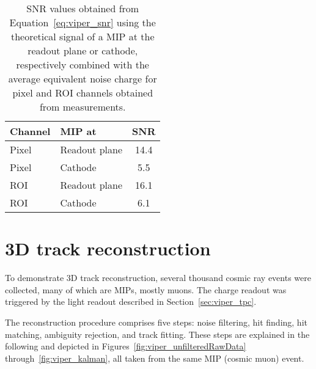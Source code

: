 \begin{table}[htb]
	\centering
	\caption{SNR values obtained from Equation~\eqref{eq:viper_snr} using the theoretical signal of a MIP at the readout plane or cathode, respectively combined with the average equivalent noise charge for pixel and ROI channels obtained from measurements.}
	\label{tab:viper_snr}
	\begin{tabu} to \textwidth {|l|l|S|}
		\hline
		{Channel} &	{MIP at} &			{SNR} \\
		\hline
		\hline
		{Pixel} &	{Readout plane} &	\num{14.4} \\
		\hline
		{Pixel} &	{Cathode} &			\num{5.5} \\
		\hline
		{ROI} &		{Readout plane} &	\num{16.1} \\
		\hline
		{ROI} &		{Cathode} &			\num{6.1} \\
		\hline
	\end{tabu}
\end{table}


\section{3D track reconstruction}
\label{sec:viper_reco}


To demonstrate 3D track reconstruction, several thousand cosmic ray events were collected, many of which are MIPs, mostly muons.
The charge readout was triggered by the light readout described in Section~\ref{sec:viper_tpc}.

The reconstruction procedure comprises five steps: noise filtering, hit finding, hit matching, ambiguity rejection, and track fitting.
These steps are explained in the following and depicted in Figures~\ref{fig:viper_unfilteredRawData} through~\ref{fig:viper_kalman}, all taken from the same MIP (cosmic muon) event.

